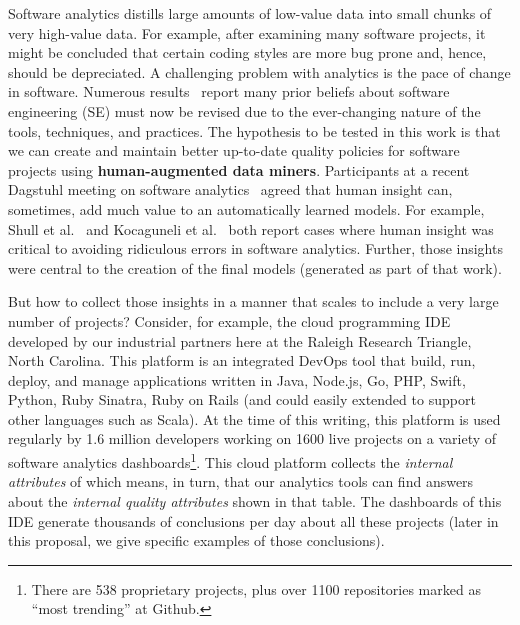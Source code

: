 Software analytics distills large amounts of low-value data
into small chunks of very high-value data. For example, after examining many software projects,
it might be concluded that certain coding styles are more bug prone and, hence, should
be depreciated.
A challenging problem with     analytics is the pace of change
in   software. Numerous results~\cite{Pa11,Jo09,De16,Me17} report   many prior beliefs
about software engineering (SE) must now be revised due to the ever-changing nature of the tools,
techniques, and practices.
The hypothesis to be tested in this work is that we can create and maintain
 better  up-to-date quality policies for software projects using  {\bf human-augmented data miners}. Participants at a recent
 Dagstuhl meeting on software analytics~\cite{gall_et_al14}  agreed that human insight can, sometimes, add much value to an automatically 
 learned models. For example,  Shull et al.~\cite{shull02} and Kocaguneli et al.~\cite{kocaguneli2013distributed} both report cases where human insight was critical to avoiding ridiculous errors in software analytics. Further, those insights were central to the creation of the final models (generated
 as part of that work).

But how to collect those insights in a manner that scales to include a very large number of projects?  Consider, for example, the cloud
programming IDE developed 
by our industrial partners here at the Raleigh Research Triangle, North Carolina. 
This platform is an integrated DevOps tool that  build, run, deploy, and  manage  applications written in   Java, Node.js,  Go, PHP,  Swift,  Python,  Ruby  Sinatra,  Ruby  on Rails (and could  easily extended to support other languages  such  as  Scala).   At  the  time of this writing, this platform is used regularly by 1.6 million developers working on   1600 live projects on a variety of software analytics dashboards\footnote{There are  538 proprietary projects, plus over 1100 repositories marked as ``most trending'' at Github.}.  This cloud platform collects the {\em internal attributes} of  which means, in turn,
that our analytics tools can  find answers about the {\em internal quality attributes}
shown in that table.
The  dashboards of this IDE generate thousands of conclusions
per day about all these projects  (later in this proposal, we give specific examples of those conclusions).

